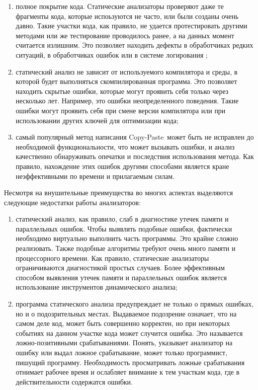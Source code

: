 \begin{enumerate}

    \item полное покрытие кода. Статические анализаторы проверяют даже те фрагменты кода, которые испоьзуются не часто, или были созданы очень давно. Такие участки кода, как правило, не удается протестировать другими методами или же тестирование проводилось ранее, а на данных момент считается излишним. Это позволяет находить дефекты в обработчиках редких ситуаций, в обработчиках ошибок или в системе логирования \cite{15};
    
    \item статический анализ не зависит от используемого компилятора и среды, в которой будет выполняться скомпилированная программа. Это позволяет находить скрытые ошибки, которые могут проявить себя только через несколько лет. Например, это ошибки неопределенного поведения. Такие ошибки могут проявить себя при смене версии компилятора или при использовании других ключей для оптимизации кода;
      
    \item самый популярный метод написания \guillemotleft Copy-Paste\guillemotright \ может быть не исправлен до необходимой функциональности, что может вызывать ошибки, и анализ качественно обнаруживать опечатки и последствия использования метода. Как правило, нахождение этих ошибок другими способами является кране неэффективными по времени и прилагаемым силам.

\end{enumerate}

Несмотря на внушительные преимущества во многих аспектах выделяются следующие недостатки работы анализаторов:

\begin{enumerate}

    \item статический анализ, как правило, слаб в диагностике утечек памяти и параллельных ошибок. Чтобы выявлять подобные ошибки, фактически необходимо виртуально выполнить часть программы. Это крайне сложно реализовать. Также подобные алгоритмы требуют очень много памяти и процессорного времени. Как правило, статические анализаторы ограничиваются диагностикой простых случаев. Более эффективным способом выявления утечек памяти и параллельных ошибок является использование инструментов динамического анализа;
    
    \item программа статического анализа предупреждает не только о прямых ошибках, но и о подозрительных местах. Выдаваемое подозрение означает, что на самом деле код, может быть совершенно корректен, но при некоторых событиях на данном участке кода может случится ошибка. Это называется ложно-позитивными срабатываниями. Понять, указывает анализатор на ошибку или выдал ложное срабатывание, может только программист, пишущий программу. Необходимость просматривать ложные срабатывания отнимает рабочее время и ослабляет внимание к тем участкам кода, где в действительности содержатся ошибки.

\end{enumerate}

